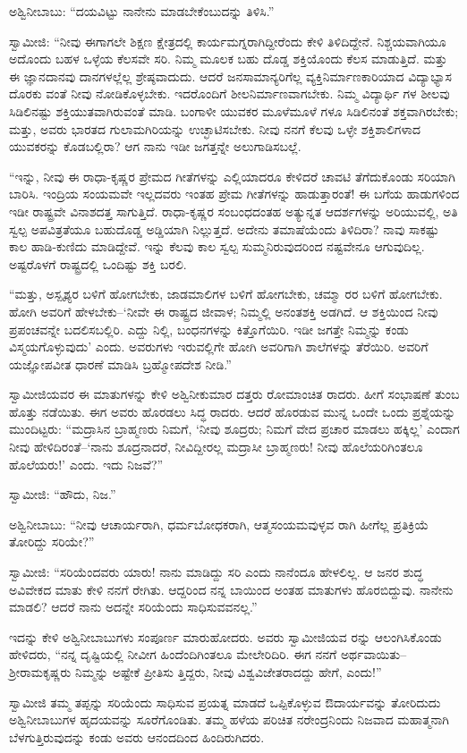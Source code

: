 ಅಶ್ವಿನೀಬಾಬು: “ದಯವಿಟ್ಟು ನಾನೇನು ಮಾಡಬೇಕೆಂಬುದನ್ನು ತಿಳಿಸಿ.”

ಸ್ವಾಮೀಜಿ: “ನೀವು ಈಗಾಗಲೇ ಶಿಕ್ಷಣ ಕ್ಷೇತ್ರದಲ್ಲಿ ಕಾರ್ಯಮಗ್ನರಾಗಿದ್ದೀರೆಂದು ಕೇಳಿ ತಿಳಿದಿದ್ದೇನೆ. ನಿಶ್ಚಯವಾಗಿಯೂ ಅದೊಂದು ಬಹಳ ಒಳ್ಳೆಯ ಕೆಲಸವೇ ಸರಿ. ನಿಮ್ಮ ಮೂಲಕ ಬಹು ದೊಡ್ಡ ಶಕ್ತಿಯೊಂದು ಕೆಲಸ ಮಾಡುತ್ತಿದೆ. ಮತ್ತು ಈ ಜ್ಞಾನದಾನವು ದಾನಗಳಲ್ಲೆಲ್ಲ ಶ್ರೇಷ್ಠವಾದುದು. ಆದರೆ ಜನಸಾಮಾನ್ಯರಿಗೆಲ್ಲ ವ್ಯಕ್ತಿನಿರ್ಮಾಣಕಾರಿಯಾದ ವಿದ್ಯಾಭ್ಯಾಸ ದೊರಕು ವಂತೆ ನೀವು ನೋಡಿಕೊಳ್ಳಬೇಕು. ಇದರೊಂದಿಗೆ ಶೀಲನಿರ್ಮಾಣವಾಗಬೇಕು. ನಿಮ್ಮ ವಿದ್ಯಾರ್ಥಿ ಗಳ ಶೀಲವು ಸಿಡಿಲಿನಷ್ಟು ಶಕ್ತಿಯುತವಾಗಿರುವಂತೆ ಮಾಡಿ. ಬಂಗಾಳೀ ಯುವಕರ ಮೂಳೆಮೂಳೆ ಗಳೂ ಸಿಡಿಲಿನಂತೆ ಶಕ್ತವಾಗಿರಬೇಕು; ಮತ್ತು, ಅವರು ಭಾರತದ ಗುಲಾಮಗಿರಿಯನ್ನು ಉಚ್ಛಾಟಿಸಬೇಕು. ನೀವು ನನಗೆ ಕೆಲವು ಒಳ್ಳೇ ಶಕ್ತಿಶಾಲಿಗಳಾದ ಯುವಕರನ್ನು ಕೊಡಬಲ್ಲಿರಾ? ಆಗ ನಾನು ಇಡೀ ಜಗತ್ತನ್ನೇ ಅಲುಗಾಡಿಸಬಲ್ಲೆ.

“ಇನ್ನು, ನೀವು ಈ ರಾಧಾ-ಕೃಷ್ಣರ ಪ್ರೇಮದ ಗೀತೆಗಳನ್ನು ಎಲ್ಲಿಯಾದರೂ ಕೇಳಿದರೆ ಚಾವಟಿ ತೆಗೆದುಕೊಂಡು ಸರಿಯಾಗಿ ಬಾರಿಸಿ. ಇಂದ್ರಿಯ ಸಂಯಮವೇ ಇಲ್ಲದವರು ಇಂತಹ ಪ್ರೇಮ ಗೀತೆಗಳನ್ನು ಹಾಡುತ್ತಾರಂತೆ! ಈ ಬಗೆಯ ಹಾಡುಗಳಿಂದ ಇಡೀ ರಾಷ್ಟ್ರವೇ ವಿನಾಶದತ್ತ ಸಾಗುತ್ತಿದೆ. ರಾಧಾ-ಕೃಷ್ಣರ ಸಂಬಂಧದಂತಹ ಅತ್ಯುನ್ನತ ಆದರ್ಶಗಳನ್ನು ಅರಿಯುವಲ್ಲಿ, ಅತಿ ಸ್ವಲ್ಪ ಅಪವಿತ್ರತೆಯೂ ಬಹುದೊಡ್ಡ ಅಡ್ಡಿಯಾಗಿ ನಿಲ್ಲುತ್ತದೆ. ಅದೇನು ತಮಾಷೆಯೆಂದು ತಿಳಿದಿರಾ? ನಾವು ಸಾಕಷ್ಟು ಕಾಲ ಹಾಡಿ-ಕುಣಿದು ಮಾಡಿದ್ದೇವೆ. ಇನ್ನು ಕೆಲವು ಕಾಲ ಸ್ವಲ್ಪ ಸುಮ್ಮನಿರುವುದರಿಂದ ನಷ್ಟವೇನೂ ಆಗುವುದಿಲ್ಲ. ಅಷ್ಟರೊಳಗೆ ರಾಷ್ಟ್ರದಲ್ಲಿ ಒಂದಿಷ್ಟು ಶಕ್ತಿ ಬರಲಿ.

“ಮತ್ತು, ಅಸ್ಪೃಶ್ಯರ ಬಳಿಗೆ ಹೋಗಬೇಕು, ಜಾಡಮಾಲಿಗಳ ಬಳಿಗೆ ಹೋಗಬೇಕು, ಚಮ್ಮಾ ರರ ಬಳಿಗೆ ಹೋಗಬೇಕು. ಹೋಗಿ ಅವರಿಗೆ ಹೇಳಬೇಕು–‘ನೀವೇ ಈ ರಾಷ್ಟ್ರದ ಜೀವಾಳ; ನಿಮ್ಮಲ್ಲಿ ಅನಂತಶಕ್ತಿ ಅಡಗಿದೆ. ಆ ಶಕ್ತಿಯಿಂದ ನೀವು ಪ್ರಪಂಚವನ್ನೇ ಬದಲಿಸಬಲ್ಲಿರಿ. ಎದ್ದು ನಿಲ್ಲಿ, ಬಂಧನಗಳನ್ನು ಕಿತ್ತೊಗೆಯಿರಿ. ಇಡೀ ಜಗತ್ತೇ ನಿಮ್ಮನ್ನು ಕಂಡು ವಿಸ್ಮಯಗೊಳ್ಳುವುದು’ ಎಂದು. ಅವರುಗಳು ಇರುವಲ್ಲಿಗೇ ಹೋಗಿ ಅವರಿಗಾಗಿ ಶಾಲೆಗಳನ್ನು ತೆರೆಯಿರಿ. ಅವರಿಗೆ ಯಜ್ಞೋಪವೀತ ಧಾರಣೆ ಮಾಡಿಸಿ ಬ್ರಹ್ಮೋಪದೇಶ ನೀಡಿ.”

ಸ್ವಾಮೀಜಿಯವರ ಈ ಮಾತುಗಳನ್ನು ಕೇಳಿ ಅಶ್ವಿನೀಕುಮಾರ ದತ್ತರು ರೋಮಾಂಚಿತ ರಾದರು. ಹೀಗೆ ಸಂಭಾಷಣೆ ತುಂಬ ಹೊತ್ತು ನಡೆಯಿತು. ಈಗ ಅವರು ಹೊರಡಲು ಸಿದ್ಧ ರಾದರು. ಆದರೆ ಹೊರಡುವ ಮುನ್ನ ಒಂದೇ ಒಂದು ಪ್ರಶ್ನೆಯನ್ನು ಮುಂದಿಟ್ಟರು: “ಮದ್ರಾಸಿನ ಬ್ರಾಹ್ಮಣರು ನಿಮಗೆ, ‘ನೀವು ಶೂದ್ರರು; ನಿಮಗೆ ವೇದ ಪ್ರಚಾರ ಮಾಡಲು ಹಕ್ಕಿಲ್ಲ’ ಎಂದಾಗ ನೀವು ಹೇಳಿದಿರಂತೆ–‘ನಾನು ಶೂದ್ರನಾದರೆ, ನೀವಿದ್ದೀರಲ್ಲ ಮದ್ರಾಸೀ ಬ್ರಾಹ್ಮಣರು! ನೀವು ಹೊಲೆಯರಿಗಿಂತಲೂ ಹೊಲೆಯರು!’ ಎಂದು. ಇದು ನಿಜವೆ?”

ಸ್ವಾಮೀಜಿ: “ಹೌದು, ನಿಜ.”

ಅಶ್ವಿನೀಬಾಬು: “ನೀವು ಆಚಾರ್ಯರಾಗಿ, ಧರ್ಮಬೋಧಕರಾಗಿ, ಆತ್ಮಸಂಯಮವುಳ್ಳವ ರಾಗಿ ಹೀಗೆಲ್ಲ ಪ್ರತಿಕ್ರಿಯೆ ತೋರಿದ್ದು ಸರಿಯೇ?”

ಸ್ವಾಮೀಜಿ: “ಸರಿಯೆಂದವರು ಯಾರು! ನಾನು ಮಾಡಿದ್ದು ಸರಿ ಎಂದು ನಾನೆಂದೂ ಹೇಳಲಿಲ್ಲ. ಆ ಜನರ ಶುದ್ಧ ಅವಿವೇಕದ ಮಾತು ಕೇಳಿ ನನಗೆ ರೇಗಿತು. ಆದ್ದರಿಂದ ನನ್ನ ಬಾಯಿಂದ ಅಂತಹ ಮಾತುಗಳು ಹೊರಬಿದ್ದುವು. ನಾನೇನು ಮಾಡಲಿ? ಆದರೆ ನಾನು ಅದನ್ನೇ ಸರಿಯೆಂದು ಸಾಧಿಸುವವನಲ್ಲ.”

ಇದನ್ನು ಕೇಳಿ ಅಶ್ವಿನೀಬಾಬುಗಳು ಸಂಪೂರ್ಣ ಮಾರುಹೋದರು. ಅವರು ಸ್ವಾಮೀಜಿಯವ ರನ್ನು ಆಲಂಗಿಸಿಕೊಂಡು ಹೇಳಿದರು, “ನನ್ನ ದೃಷ್ಟಿಯಲ್ಲಿ ನೀವೀಗ ಹಿಂದೆಂದಿಗಿಂತಲೂ ಮೇಲೇರಿದಿರಿ. ಈಗ ನನಗೆ ಅರ್ಥವಾಯಿತು–ಶ್ರೀರಾಮಕೃಷ್ಣರು ನಿಮ್ಮನ್ನು ಅಷ್ಟೇಕೆ ಪ್ರೀತಿಸು ತ್ತಿದ್ದರು, ನೀವು ವಿಶ್ವವಿಜೇತರಾದದ್ದು ಹೇಗೆ, ಎಂದು!”

ಸ್ವಾಮೀಜಿ ತಮ್ಮ ತಪ್ಪನ್ನು ಸರಿಯೆಂದು ಸಾಧಿಸುವ ಪ್ರಯತ್ನ ಮಾಡದೆ ಒಪ್ಪಿಕೊಳ್ಳುವ ಔದಾರ್ಯವನ್ನು ತೋರಿದುದು ಅಶ್ವಿನೀಬಾಬುಗಳ ಹೃದಯವನ್ನು ಸೂರೆಗೊಂಡಿತು. ತಮ್ಮ ಹಳೆಯ ಪರಿಚಿತ ನರೇಂದ್ರನಿಂದು ನಿಜವಾದ ಮಹಾತ್ಮನಾಗಿ ಬೆಳಗುತ್ತಿರುವುದನ್ನು ಕಂಡು ಅವರು ಆನಂದದಿಂದ ಹಿಂದಿರುಗಿದರು.

